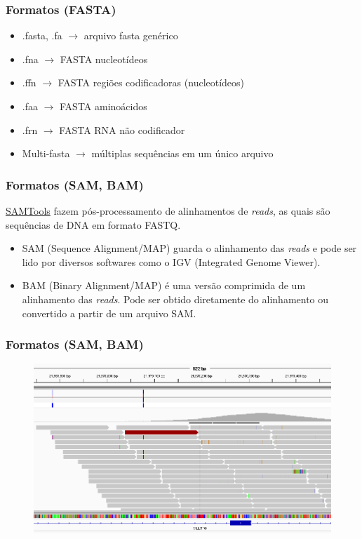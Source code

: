 \documentclass{beamer}
\begin{document}
	\begin{frame}\frametitle{Formatos (FASTA)}
		\begin{itemize}
		\item .fasta, .fa $\rightarrow$ arquivo fasta genérico 
		\item .fna $\rightarrow$ FASTA nucleotídeos
		\item .ffn $\rightarrow$ FASTA regiões codificadoras (nucleotídeos)
		\item .faa $\rightarrow$ FASTA aminoácidos
		\item .frn $\rightarrow$ FASTA RNA não codificador
		\end{itemize}
		\begin{itemize}
		\item Multi-fasta $\rightarrow$ múltiplas sequências em um único arquivo
		\end{itemize}
	\end{frame}

	\begin{frame}\frametitle{Formatos (SAM, BAM)}
		\href{http://www.htslib.org/}{SAMTools} fazem pós-processamento de alinhamentos de \textit{reads}, as quais são sequências de DNA em formato FASTQ.\\
		\begin{itemize}
		\item SAM (Sequence Alignment/MAP) guarda o alinhamento das \textit{reads} e pode ser lido por diversos softwares como o IGV (Integrated Genome Viewer).
		\item BAM (Binary Alignment/MAP) é uma versão comprimida de um alinhamento das \textit{reads}. Pode ser obtido diretamente do alinhamento ou convertido a partir de um arquivo SAM.
		\end{itemize}
	\end{frame}

	\begin{frame}\frametitle{Formatos (SAM, BAM)}
	\begin{figure}[ht]
		\centering
		\includegraphics[width=\textwidth]{img/igv.png}
	\end{figure}
	\end{frame}
\end{document}
